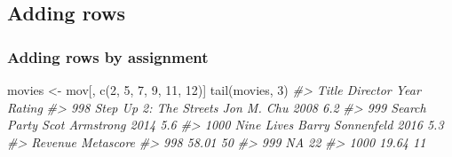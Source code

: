 \documentclass[
]{book}
\newenvironment{Shaded}{\begin{snugshade}}{\end{snugshade}}
\newcommand{\CommentTok}[1]{\textcolor[rgb]{0.56,0.35,0.01}{\textit{#1}}}
\newcommand{\DecValTok}[1]{\textcolor[rgb]{0.00,0.00,0.81}{#1}}
\newcommand{\FunctionTok}[1]{\textcolor[rgb]{0.00,0.00,0.00}{#1}}
\newcommand{\NormalTok}[1]{#1}
\newcommand{\OtherTok}[1]{\textcolor[rgb]{0.56,0.35,0.01}{#1}}
\begin{document}
\hypertarget{adding-rows}{%
\subsection{Adding rows}\label{adding-rows}}

\hypertarget{adding-rows-by-assignment}{%
\subsubsection{Adding rows by assignment}\label{adding-rows-by-assignment}}

\begin{Shaded}
\begin{Highlighting}[]
\NormalTok{movies }\OtherTok{\textless{}{-}}\NormalTok{ mov[, }\FunctionTok{c}\NormalTok{(}\DecValTok{2}\NormalTok{, }\DecValTok{5}\NormalTok{, }\DecValTok{7}\NormalTok{, }\DecValTok{9}\NormalTok{, }\DecValTok{11}\NormalTok{, }\DecValTok{12}\NormalTok{)]}
\FunctionTok{tail}\NormalTok{(movies, }\DecValTok{3}\NormalTok{)}
\CommentTok{\#\textgreater{}                       Title         Director Year Rating}
\CommentTok{\#\textgreater{} 998  Step Up 2: The Streets       Jon M. Chu 2008    6.2}
\CommentTok{\#\textgreater{} 999            Search Party   Scot Armstrong 2014    5.6}
\CommentTok{\#\textgreater{} 1000             Nine Lives Barry Sonnenfeld 2016    5.3}
\CommentTok{\#\textgreater{}      Revenue Metascore}
\CommentTok{\#\textgreater{} 998    58.01        50}
\CommentTok{\#\textgreater{} 999       NA        22}
\CommentTok{\#\textgreater{} 1000   19.64        11}


\end{Highlighting}
\end{Shaded}
\end{document}
